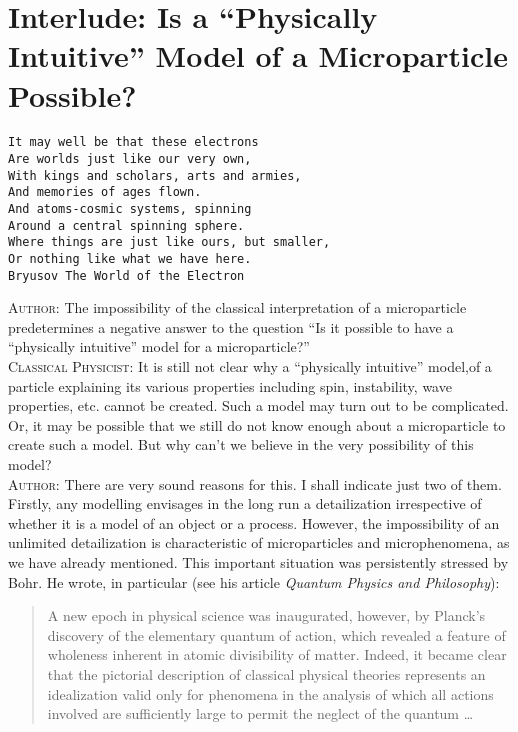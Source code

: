 \documentclass[a4paper,sfsidenotes,colorlinks=true]{tufte-book}
\numberwithin{equation}{section}
\numberwithin{figure}{section}
\begin{document}
\section*{Interlude: Is a ``Physically Intuitive'' Model of a Microparticle Possible?}
\label{interlude-02}
\paragraph{}
\begin{Verbatim}[formatcom=\color{darkgray},fontsize=\small]
It may well be that these electrons
Are worlds just like our very own,
With kings and scholars, arts and armies,
And memories of ages flown.
And atoms-cosmic systems, spinning
Around a central spinning sphere.
Where things are just like ours, but smaller, 
Or nothing like what we have here.
Bryusov The World of the Electron
\end{Verbatim}


\vspace{8pt}




\textsc{Author:} The impossibility  of the classical interpretation of a microparticle
predetermines a negative answer to the question ``Is it possible to
have a ``physically intuitive'' model for a microparticle?''
\\
\textsc{Classical Physicist:} It is still not clear why a ``physically
intuitive'' model,of a particle explaining its various properties
including spin, instability, wave properties, etc. cannot be
created. Such a model may turn out to be complicated. Or, it may be
possible that we still do not know enough about a microparticle to
create such a model.  But why can't we believe in the very possibility
of this model?
\\
\textsc{Author:} There are very sound reasons for this. I shall
indicate just two of them. Firstly, any modelling envisages in the
long run a detailization irrespective of whether it is a model of an
object or a process. However, the impossibility of an unlimited
detailization is characteristic of microparticles and microphenomena,
as we have already mentioned. This important situation was
persistently stressed by Bohr. He wrote, in particular (see his
article \emph{Quantum Physics and Philosophy}):
\begin{quote}
  A new epoch in physical science was inaugurated, however, by
  Planck's discovery of the elementary quantum of action, which
  revealed a feature of wholeness inherent in atomic divisibility of
  matter. Indeed, it became clear that the pictorial description of
  classical physical theories represents an idealization valid only
  for phenomena in the analysis of which all actions involved are
  sufficiently large to permit the neglect of the quantum \ldots \cite{bohr-1963}
\end{quote}
\end{document}
